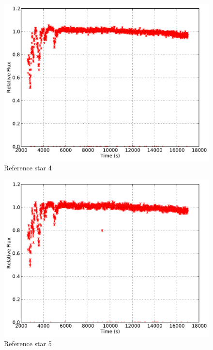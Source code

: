 \documentclass{aastex61}
\begin{document}
\begin{figure}[h]
	\centering
	\includegraphics[scale = .30]{exo_curves4.pdf}
	\caption{Reference star 4}
	\label{fig: refcurve4}
\end{figure}
\begin{figure}[h]
	\centering
	\includegraphics[scale = .30]{exo_curves5.pdf}
	\caption{Reference star 5}
	\label{fig: refcurve5}
\end{figure}
\end{document}
